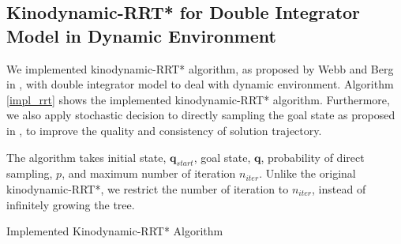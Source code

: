 \documentclass[conference]{IEEEtran}
\newcommand{\func}{\textrm}
\let\oldReturn\Return
\renewcommand{\Return}{\State\oldReturn}
\begin{document}
\subsection{Kinodynamic-RRT* for Double Integrator Model in Dynamic Environment}

We implemented kinodynamic-RRT* algorithm, as proposed by Webb and Berg in \cite{webb2013kinodynamic}, with double integrator model to deal with dynamic environment. Algorithm \ref{impl_rrt} shows the implemented kinodynamic-RRT* algorithm. Furthermore, we also apply stochastic decision to directly sampling the goal state as proposed in \cite{bruce2002real}, to improve the quality and consistency of solution trajectory.

The algorithm takes initial state, $\boldsymbol{q}_{start}$, goal state, $\boldsymbol{q}$, probability of direct sampling, $p$, and maximum number of iteration $n_{iter}$. Unlike the original kinodynamic-RRT*, we restrict the number of iteration to $n_{iter}$, instead of infinitely growing the tree. 

\begin{algorithm}[ht!]
\caption{Implemented Kinodynamic-RRT* Algorithm}
\label{impl_rrt}
\end{algorithm}
\end{document}
